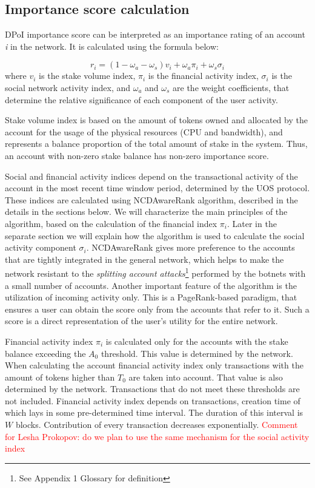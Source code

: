 \documentclass[a4paper,12pt]{article}
\begin{document}
\subsection{Importance score calculation}

DPoI importance score can be interpreted as an importance rating of an account \textit{i} in the network. It is calculated using the formula below: 

\begin{equation}
	    \label{importance_rating}
	    r_i = (1 - \omega_a - \omega_s) v_i + \omega_a \pi_i + \omega_s \sigma_i
	\end{equation}
where $v_i$ is the stake volume index, $\pi_i$ is the financial activity index, $\sigma_i$ is the social network activity index, and $\omega_a$ and $\omega_s$ are the weight coefficients, that determine the relative significance of each component of the user activity. 

Stake volume index is based on the amount of tokens owned and allocated by the account for the usage of the physical resources (CPU and bandwidth), and represents a balance proportion of the total amount of stake in the system. Thus, an account with non-zero stake balance has non-zero importance score. 

Social and financial activity indices depend on the transactional activity of the account in the most recent time window period, determined by the U{\degree}OS protocol. These indices are calculated using NCDAwareRank algorithm, described in the details in the sections below. We will characterize the main principles of the algorithm, based on the calculation of the financial index $\pi_i$. Later in the separate section we will explain how the algorithm is used to calculate the social activity component $\sigma_i$.  NCDAwareRank gives more preference to the accounts that are tightly integrated in the general network, which helps to make the network resistant to the \emph{splitting account attacks}\footnote{See Appendix 1 Glossary for definition} performed by the botnets with a small number of accounts. Another important feature of the algorithm is the utilization of incoming activity only. This is a PageRank-based paradigm, that ensures a user can obtain the score only from the accounts that refer to it. Such a score is a direct representation of the user's utility for the entire network.

Financial activity index $\pi_i$ is calculated only for the accounts with the stake balance exceeding the $A_0$ threshold. This value is determined by the network. When calculating the account financial activity index only transactions with the amount of tokens higher than $T_0$ are taken into account. That value is also determined by the network. Transactions that do not meet these thresholds are not included. Financial activity index depends on transactions, creation time of which lays in some pre-determined time interval. The duration of this interval is $W$ blocks. Contribution of every transaction decreases exponentially.
\textcolor{red}{Comment for Lesha Prokopov: do we plan to use the same mechanism for the social activity index}
\end{document}
